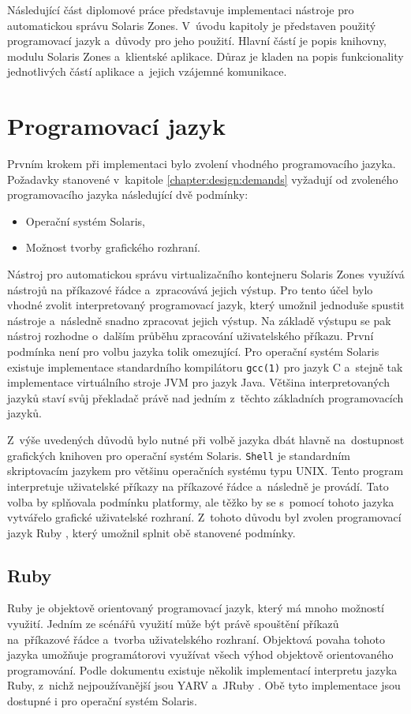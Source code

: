 \label{chapter:implementation}
Následující část diplomové práce představuje implementaci nástroje pro automatickou správu Solaris Zones. V~úvodu
kapitoly je představen použitý programovací jazyk a~důvody pro jeho použití. Hlavní částí
je popis knihovny, modulu Solaris Zones a~klientské aplikace. Důraz je kladen na popis funkcionality jednotlivých 
částí aplikace a~jejich vzájemné komunikace.
\section{Programovací jazyk}
\label{chapter:implementation:language}
Prvním krokem  při implementaci bylo zvolení vhodného programovacího jazyka. Požadavky stanovené v~kapitole 
\ref{chapter:design:demands} vyžadují od zvoleného programovacího jazyka následující dvě podmínky:
\begin{itemize}
 \item Operační systém Solaris,
 \item Možnost tvorby grafického rozhraní.
\end{itemize}
Nástroj pro automatickou správu virtualizačního kontejneru Solaris Zones využívá
nástrojů na příkazové řádce a~zpracovává jejich výstup. Pro tento účel bylo vhodné zvolit interpretovaný
programovací jazyk, který umožnil jednoduše spustit nástroje a~následně snadno zpracovat jejich výstup. Na základě
výstupu se pak nástroj rozhodne o~dalším průběhu zpracování uživatelského příkazu. První podmínka není pro volbu jazyka
tolik omezující. Pro operační systém Solaris existuje implementace standardního kompilátoru \verb|gcc(1)|
pro jazyk C a~stejně tak implementace virtuálního stroje JVM pro jazyk Java. Většina interpretovaných jazyků
staví svůj překladač právě nad jedním z~těchto základních programovacích jazyků.

Z~výše uvedených důvodů bylo nutné při volbě jazyka dbát hlavně na~dostupnost grafických knihoven pro operační systém
Solaris. \verb|Shell| je standardním skriptovacím jazykem pro většinu operačních systému typu UNIX. Tento program
interpretuje uživatelské příkazy na příkazové řádce a~následně je provádí. Tato volba by splňovala podmínku platformy,
ale těžko by se s~pomocí tohoto jazyka vytvářelo grafické uživatelské rozhraní. Z~tohoto důvodu byl zvolen programovací
jazyk Ruby \cite{ruby}, který umožnil splnit obě stanovené podmínky.
\subsection{Ruby}
\label{chapter:implementation:language:ruby}
Ruby je objektově orientovaný programovací jazyk, který má mnoho možností využití. Jedním ze scénářů využití může být
právě spouštění příkazů na~příkazové řádce a~tvorba uživatelského rozhraní. Objektová povaha tohoto jazyka umožňuje
programátorovi využívat všech výhod objektově orientovaného programování. Podle dokumentu \cite{ruby:implementation}
existuje několik implementací interpretu jazyka Ruby, z~nichž nejpoužívanější jsou YARV \cite{ruby:implementation:yarv} 
a~JRuby \cite{ruby:implementation:jruby}. Obě tyto implementace jsou dostupné i pro operační systém Solaris.

